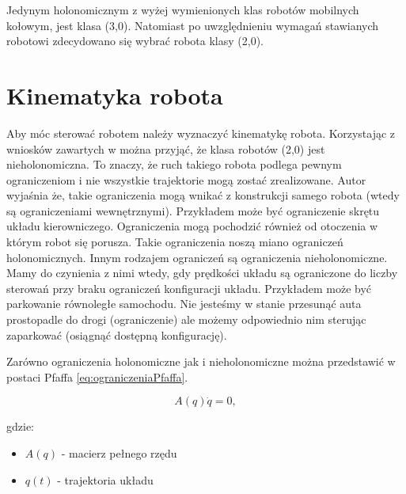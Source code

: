     	Jedynym holonomicznym z wyżej wymienionych klas robotów mobilnych kołowym, jest klasa (3,0). Natomiast po uwzględnieniu wymagań stawianych robotowi zdecydowano się wybrać robota klasy (2,0). 

    \section{Kinematyka robota}
        Aby móc sterować robotem należy wyznaczyć kinematykę robota. Korzystając z wniosków zawartych w \cite{Mazur} można przyjąć, że klasa robotów (2,0) jest nieholonomiczna. To znaczy, że ruch takiego robota podlega pewnym ograniczeniom i nie wszystkie trajektorie mogą zostać zrealizowane. Autor wyjaśnia że, takie ograniczenia mogą wnikać z konstrukcji samego robota (wtedy są ograniczeniami wewnętrznymi). Przykładem może być ograniczenie skrętu układu kierowniczego. Ograniczenia mogą pochodzić również od otoczenia w którym robot się porusza. Takie ograniczenia noszą miano ograniczeń holonomicznych. Innym rodzajem ograniczeń są ograniczenia nieholonomiczne. Mamy do czynienia z nimi wtedy, gdy prędkości układu są ograniczone do liczby sterowań %
        przy braku ograniczeń konfiguracji układu. Przykładem może być parkowanie równoległe samochodu. Nie jesteśmy w stanie przesunąć auta prostopadle do drogi (ograniczenie) ale możemy odpowiednio nim sterując zaparkować (osiągnąć dostępną konfigurację).

        Zarówno ograniczenia holonomiczne jak i nieholonomiczne można przedstawić w postaci Pfaffa \ref{eq:ograniczeniaPfaffa}.
        
        \begin{equation}
            A(q)\dot{q}=0,
            \label{eq:ograniczeniaPfaffa}
        \end{equation}
        
        gdzie:
        
        \begin{itemize}
            \item[] $A(q)$ - macierz pełnego rzędu
            \item[] $q(t)$ - trajektoria układu
        \end{itemize}
        
